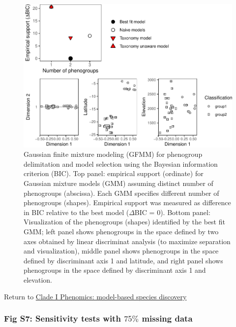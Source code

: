 \documentclass[
  11pt,
]{article}
\begin{document}
\begin{figure}
\includegraphics{Supplementary_Material_files/figure-latex/cladeImorphologicalDelimitationPlots-1} \caption{Gaussian finite mixture modeling (GFMM) for phenogroup delimitation and model selection using the Bayesian information criterion (BIC). Top panel: empirical support (ordinate) for Gaussian mixture models (GMM) assuming distinct number of phenogroups (abscissa). Each GMM specifies different number of phenogroups (shapes). Empirical support was measured as difference in BIC relative to the best model ($\Delta$BIC = $0$). Bottom panel: Visualization of the phenogroups (shapes) identified by the best fit GMM; left panel shows phenogroups in the space defined by two axes obtained by linear discriminat analysis (to maximize separation and visualization), middle panel shows phenogroups in the space defined by discriminant axis 1 and latitude, and right panel shows phenogroups in the space defined by discriminant axis 1 and elevation.}\label{fig:cladeImorphologicalDelimitationPlots}
\end{figure}

Return to \protect\hyperlink{model-based-species-discovery}{Clade I Phenomics: model-based species discovery}
\pagebreak

\hypertarget{fig-s7-sensitivity-tests-with-75-missing-data}{%
\subsubsection{\texorpdfstring{Fig S7: Sensitivity tests with \(75\%\) missing data}{Fig S7: Sensitivity tests with 75\textbackslash\% missing data}}\label{fig-s7-sensitivity-tests-with-75-missing-data}}
\end{document}
